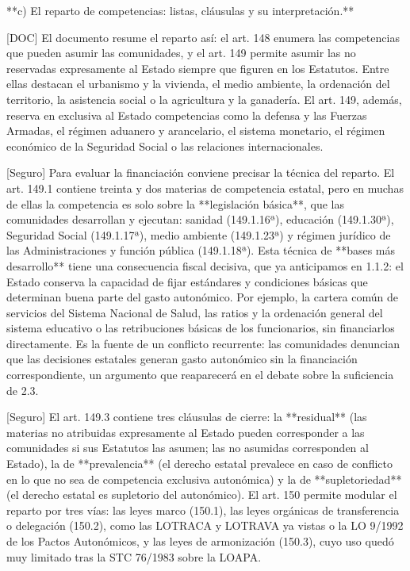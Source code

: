 \documentclass[10pt,a4paper]{article}
\begin{document}
**c) El reparto de competencias: listas, cláusulas y su interpretación.**

[DOC] El documento resume el reparto así: el art. 148 enumera las competencias que pueden asumir las comunidades, y el art. 149 permite asumir las no reservadas expresamente al Estado siempre que figuren en los Estatutos. Entre ellas destacan el urbanismo y la vivienda, el medio ambiente, la ordenación del territorio, la asistencia social o la agricultura y la ganadería. El art. 149, además, reserva en exclusiva al Estado competencias como la defensa y las Fuerzas Armadas, el régimen aduanero y arancelario, el sistema monetario, el régimen económico de la Seguridad Social o las relaciones internacionales.

[Seguro] Para evaluar la financiación conviene precisar la técnica del reparto. El art. 149.1 contiene treinta y dos materias de competencia estatal, pero en muchas de ellas la competencia es solo sobre la **legislación básica**, que las comunidades desarrollan y ejecutan: sanidad (149.1.16ª), educación (149.1.30ª), Seguridad Social (149.1.17ª), medio ambiente (149.1.23ª) y régimen jurídico de las Administraciones y función pública (149.1.18ª). Esta técnica de **bases más desarrollo** tiene una consecuencia fiscal decisiva, que ya anticipamos en 1.1.2: el Estado conserva la capacidad de fijar estándares y condiciones básicas que determinan buena parte del gasto autonómico. Por ejemplo, la cartera común de servicios del Sistema Nacional de Salud, las ratios y la ordenación general del sistema educativo o las retribuciones básicas de los funcionarios, sin financiarlos directamente. Es la fuente de un conflicto recurrente: las comunidades denuncian que las decisiones estatales generan gasto autonómico sin la financiación correspondiente, un argumento que reaparecerá en el debate sobre la suficiencia de 2.3.

[Seguro] El art. 149.3 contiene tres cláusulas de cierre: la **residual** (las materias no atribuidas expresamente al Estado pueden corresponder a las comunidades si sus Estatutos las asumen; las no asumidas corresponden al Estado), la de **prevalencia** (el derecho estatal prevalece en caso de conflicto en lo que no sea de competencia exclusiva autonómica) y la de **supletoriedad** (el derecho estatal es supletorio del autonómico). El art. 150 permite modular el reparto por tres vías: las leyes marco (150.1), las leyes orgánicas de transferencia o delegación (150.2), como las LOTRACA y LOTRAVA ya vistas o la LO 9/1992 de los Pactos Autonómicos, y las leyes de armonización (150.3), cuyo uso quedó muy limitado tras la STC 76/1983 sobre la LOAPA.
\end{document}
